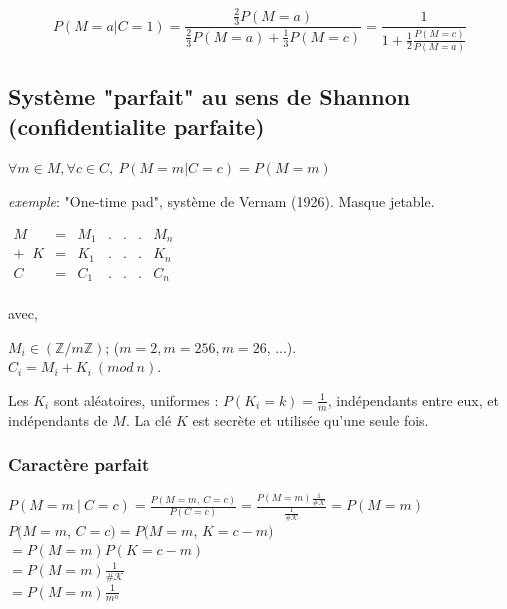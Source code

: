 \documentclass[12pt,a4paper]{article}
\begin{document}
$$P(M=a \vert C=1) = \frac{\frac{2}{3}P(M=a)}{\frac{2}{3}P(M=a)+\frac{1}{3}P(M=c)}=\frac{1}{1+\frac{1}{2}\frac{P(M=c)}{P(M=a)}}$$

\subsection{Système "parfait" au sens de Shannon (confidentialite parfaite)}

\begin{center}
$\forall m \in M, \forall c \in C, \ P(M=m \vert C=c) = P(M=m)$
\end{center}

\textit{exemple}: "One-time pad", système de Vernam (1926). Masque jetable.

\bigskip

\begin{center}
$\begin{array}{rcccccc} 
      M & = & M_1 & . & . & . & M_n \\
+\;\; K & = & K_1 & . & . & . & K_n \\
\hline
      C & = & C_1 & . & . & . & C_n\\
\end{array}$
\end{center}

avec,

\medskip

$M_i \in (\mathds{Z}/m\mathds{Z})$; ($m=2, m=256, m=26$, ...).\\
\hspace*{0.7cm}$C_i = M_i + K_i \ (mod \ n)$.

\bigskip

Les $K_i$ sont aléatoires, uniformes : $P(K_i=k)=\frac{1}{m}$, indépendants entre eux, et indépendants de $M$. La clé $K$ est secrète et utilisée qu'une seule fois.

\subsubsection{Caractère parfait} 

$P(M=m \ \vert\  C=c)=\displaystyle\frac{P(M=m,\ C=c)}{P(C=c)} = \displaystyle\frac{P(M=m) \frac{1}{\#\mathcal{K}}}{\frac{1}{\#\mathcal{K}}} = P(M=m) $\\

\hspace*{-0.6cm}$P(M=m$, $C=c) = P(M=m$, $K=c-m)$\\
\hspace*{3,3cm}	$= P(M=m) P(K=c-m)$\\
\hspace*{3,3cm}	$=P(M=m)\displaystyle\frac{1}{\#\mathcal{K}}$\\
\hspace*{3,3cm}	$= P(M=m) \displaystyle\frac{1}{m^n}$\\
\end{document}
